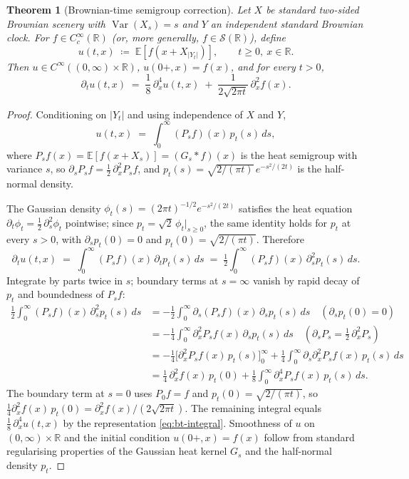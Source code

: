 \documentclass[11pt,reqno]{amsart}
\theoremstyle{plain}
\newtheorem{theorem}{Theorem}[section]
\theoremstyle{definition}
\theoremstyle{remark}
\newcommand{\R}{\mathbb{R}}
\newcommand{\E}{\mathbb{E}}
\DeclareMathOperator{\Var}{Var}
\begin{document}
\begin{theorem}[Brownian-time semigroup correction]
\label{thm:bt-correction}
Let $X$ be standard two-sided Brownian scenery with $\Var(X_s)=s$ and
$Y$ an independent standard Brownian clock. For $f\in C_c^{\infty}(\R)$
(or, more generally, $f\in\mathscr S(\R)$), define
\[
  u(t,x)\;\coloneqq\;\E[f(x+X_{|Y_t|})],
  \qquad t\ge 0,\ x\in\R.
\]
Then $u\in C^{\infty}((0,\infty)\times\R)$, $u(0+,x)=f(x)$, and for
every $t>0$,
\begin{equation}\label{eq:bt-correction}
  \partial_t u(t,x)
  \;=\;\frac{1}{8}\,\partial_x^{4}u(t,x)
       \;+\;\frac{1}{2\sqrt{2\pi t}}\,\partial_x^{2}f(x).
\end{equation}
\end{theorem}

\begin{proof}
Conditioning on $|Y_t|$ and using independence of $X$ and $Y$,
\begin{equation}\label{eq:bt-integral}
  u(t,x)\;=\;\int_0^\infty (P_s f)(x)\,p_t(s)\,ds,
\end{equation}
where $P_s f(x)=\E[f(x+X_s)]=(G_s*f)(x)$ is the heat semigroup with
variance $s$, so $\partial_s P_s f=\tfrac12\,\partial_x^{2} P_s f$,
and $p_t(s)=\sqrt{2/(\pi t)}\,e^{-s^{2}/(2t)}$ is the half-normal
density.

The Gaussian density $\phi_t(s)=(2\pi t)^{-1/2}e^{-s^{2}/(2t)}$
satisfies the heat equation $\partial_t\phi_t=\tfrac12\,\partial_s^{2}
\phi_t$ pointwise; since $p_t=\sqrt 2\,\phi_t|_{s\ge 0}$, the same
identity holds for $p_t$ at every $s>0$, with $\partial_s p_t(0)=0$
and $p_t(0)=\sqrt{2/(\pi t)}$. Therefore
\[
  \partial_t u(t,x)
  \;=\;\int_0^\infty(P_s f)(x)\,\partial_t p_t(s)\,ds
   \;=\;\tfrac12\int_0^\infty(P_s f)(x)\,\partial_s^{2}p_t(s)\,ds.
\]
Integrate by parts twice in $s$; boundary terms at $s=\infty$ vanish
by rapid decay of $p_t$ and boundedness of $P_s f$:
\[
\begin{aligned}
  \tfrac12\!\int_0^\infty\!(P_s f)(x)\,\partial_s^{2}p_t(s)\,ds
  &= -\tfrac12\!\int_0^\infty\!\partial_s(P_s f)(x)\,\partial_s p_t(s)\,ds
   \quad(\partial_s p_t(0)=0)\\
  &= -\tfrac14\!\int_0^\infty\!\partial_x^{2}P_s f(x)\,\partial_s p_t(s)\,ds
   \quad(\partial_s P_s=\tfrac12\,\partial_x^{2} P_s)\\
  &= -\tfrac14\bigl[\partial_x^{2}P_s f(x)\,p_t(s)\bigr]_0^\infty
   +\tfrac14\!\int_0^\infty\!\partial_s\partial_x^{2}P_s f(x)\,p_t(s)\,ds\\
  &= \tfrac14\,\partial_x^{2}f(x)\,p_t(0)
   +\tfrac18\!\int_0^\infty\!\partial_x^{4}P_s f(x)\,p_t(s)\,ds.
\end{aligned}
\]
The boundary term at $s=0$ uses $P_0 f=f$ and $p_t(0)=\sqrt{2/(\pi t)}$,
so $\tfrac14\partial_x^{2}f(x)\,p_t(0)=\partial_x^{2}f(x)/(2\sqrt{2\pi t})$.
The remaining integral equals $\tfrac18\,\partial_x^{4}u(t,x)$ by the
representation \eqref{eq:bt-integral}. Smoothness of $u$ on
$(0,\infty)\times\R$ and the initial condition $u(0+,x)=f(x)$ follow
from standard regularising properties of the Gaussian heat kernel
$G_s$ and the half-normal density $p_t$.
\end{proof}
\end{document}

